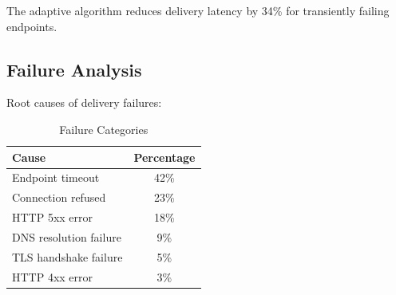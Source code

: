 The adaptive algorithm reduces delivery latency by 34\% for transiently failing endpoints.

\subsection{Failure Analysis}

Root causes of delivery failures:

\begin{table}[h]
\centering
\caption{Failure Categories}
\begin{tabular}{lc}
\toprule
\textbf{Cause} & \textbf{Percentage} \\
\midrule
Endpoint timeout & 42\% \\
Connection refused & 23\% \\
HTTP 5xx error & 18\% \\
DNS resolution failure & 9\% \\
TLS handshake failure & 5\% \\
HTTP 4xx error & 3\% \\
\bottomrule
\end{tabular}
\end{table}

